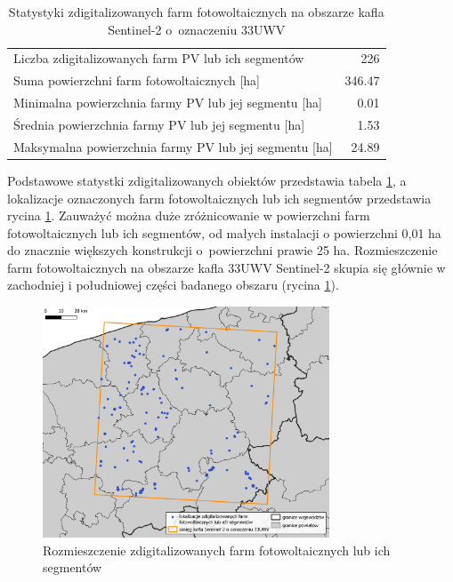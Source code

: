 \documentclass{amuthesis}
\begin{document}
\hypertarget{tbl-tabela-digitizing-results}{}
\begin{table}
\caption{\label{tbl-tabela-digitizing-results}Statystyki zdigitalizowanych farm fotowoltaicznych na obszarze kafla
Sentinel-2 o~oznaczeniu 33UWV }\tabularnewline

\centering
\begin{tabular}{lr}
\toprule
Liczba zdigitalizowanych farm PV lub ich segmentów & 226\\
Suma powierzchni farm fotowoltaicznych [ha] & 346.47\\
Minimalna powierzchnia farmy PV lub jej segmentu [ha] & 0.01\\
Średnia powierzchnia farmy PV lub jej segmentu [ha] & 1.53\\
Maksymalna powierzchnia farmy PV lub jej segmentu [ha] & 24.89\\
\bottomrule
\end{tabular}
\end{table}

Podstawowe statystki zdigitalizowanych obiektów przedstawia tabela
\ref{tbl-tabela-digitizing-results}, a lokalizacje oznaczonych farm
fotowoltaicznych lub ich segmentów przedstawia rycina
\ref{fig-rycina-spatial-distribution-pv}. Zauważyć można duże
zróżnicowanie w powierzchni farm fotowoltaicznych lub ich segmentów, od
małych instalacji o powierzchni 0,01 ha do znacznie większych
konstrukcji o~powierzchni prawie 25 ha. Rozmieszczenie farm
fotowoltaicznych na obszarze kafla 33UWV Sentinel-2 skupia się głównie w
zachodniej i południowej części badanego obszaru (rycina
\ref{fig-rycina-spatial-distribution-pv}).

\begin{figure}[H]

{\centering \includegraphics[width=0.76\textwidth,height=\textheight]{figures/farmy2.png}

}

\caption{\label{fig-rycina-spatial-distribution-pv}Rozmieszczenie
zdigitalizowanych farm fotowoltaicznych lub ich segmentów}

\end{figure}
\end{document}
